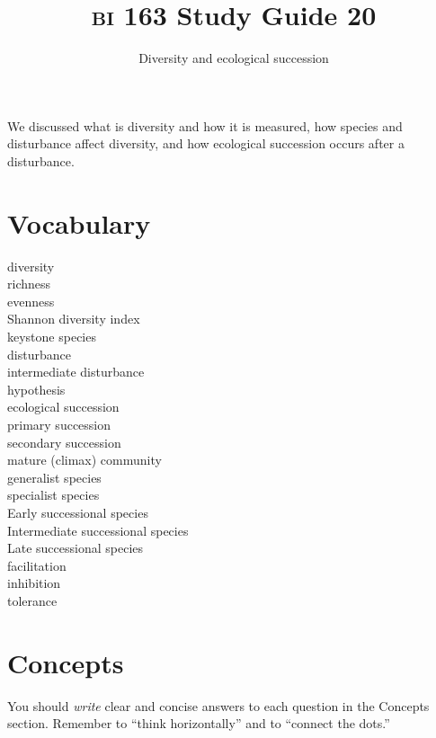\documentclass[letterpaper]{tufte-handout}
\title{{\scshape bi} 163 Study Guide 20}
\author{Diversity and ecological succession}
\date{} %
\begin{document}
\maketitle	%

We discussed what is diversity and how it is measured, how species and disturbance affect diversity, and how ecological succession occurs after a disturbance.

\section*{Vocabulary}

\vspace{-1\baselineskip}
\begin{multicols}{2}
diversity \\
richness \\
evenness \\
Shannon diversity index \\
keystone species \\
disturbance \\
intermediate disturbance\\ \hspace*{1em} hypothesis \\
ecological succession \\
primary succession \\
secondary succession \\
mature (climax) community \\
generalist species \\
specialist species \\
Early successional species \\
Intermediate successional species \\
Late successional species \\
facilitation \\
inhibition \\
tolerance
\end{multicols}

\section*{Concepts}

You should \emph{write} clear and concise answers to each question in the Concepts section.  Remember to ``think horizontally'' and to ``connect the dots.'' 
\end{document}
